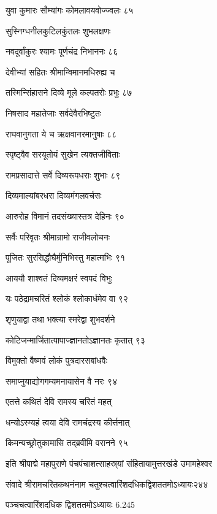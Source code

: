 युवा कुमारः सौम्यांगः कोमलावयवोज्ज्वलः ८५

सुस्निग्धनीलकुटिलकुंतलः शुभलक्षणः

नवदूर्वांकुरः श्यामः पूर्णचंद्र निभाननः ८६

देवीभ्यां सहितः श्रीमान्विमानमधिरुह्य च

तस्मिन्सिंहासने दिव्ये मूले कल्पतरोः प्रभुः ८७

निषसाद महातेजाः सर्वदेवैरभिष्टुतः

राघवानुगता ये च ऋक्षवानरमानुषाः ८८

स्पृष्ट्वैव सरयूतोयं सुखेन त्यक्तजीविताः

रामप्रसादात्ते सर्वे दिव्यरूपधराः शुभाः ८९

दिव्यमाल्यांबरधरा दिव्यमंगलवर्चसः

आरुरोह विमानं तदसंख्यास्तत्र देहिनः ९०

सर्वैः परिवृतः श्रीमान्रामो राजीवलोचनः

पूजितः सुरसिद्धौघैर्मुनिभिस्तु महात्मभिः ९१

आययौ शाश्वतं दिव्यमक्षरं स्वपदं विभुः

यः पठेद्रामचरितं श्लोकं श्लोकार्धमेव वा ९२

शृणुयाद्वा तथा भक्त्या स्मरेद्वा शुभदर्शने

कोटिजन्मार्जितात्पापाज्ज्ञानतोऽज्ञानतः कृतात् ९३

विमुक्तो वैष्णवं लोकं पुत्रदारसबांधवैः

समाप्नुयाद्योगगम्यमनायासेन वै नरः ९४

एतत्ते कथितं देवि रामस्य चरितं महत्

धन्योऽस्म्यहं त्वया देवि रामचंद्रस्य कीर्त्तनात्

किमन्यच्छ्रोतुकामासि तद्ब्रवीमि वरानने ९५

इति श्रीपाद्मे महापुराणे पंचपंचाशत्साहस्र्यां संहितायामुत्तरखंडे उमामहेश्वर

संवादे श्रीरामचरितकथनंनाम चतुश्चत्वारिंशदधिकद्विशततमोऽध्यायः२४४

पञ्चचत्वारिंशदधिक द्विशततमोऽध्यायः 6.245

